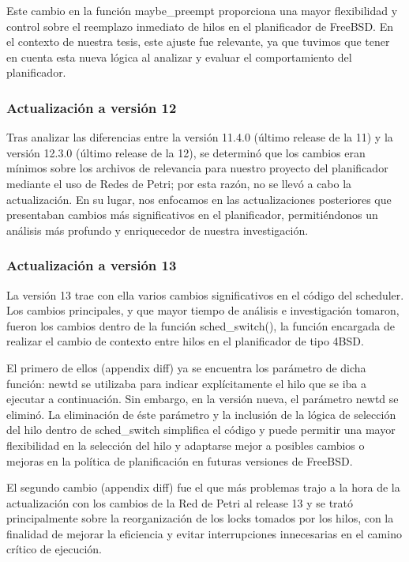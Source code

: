 Este cambio en la función maybe\_preempt proporciona una mayor flexibilidad y control sobre el reemplazo inmediato de hilos en el planificador de FreeBSD. En el contexto de nuestra tesis, este ajuste fue relevante, ya que tuvimos que tener en cuenta esta nueva lógica al analizar y evaluar el comportamiento del planificador.\par


\subsubsection{Actualización a versión 12}

Tras analizar las diferencias entre la versión 11.4.0 (último release de la 11) y la versión 12.3.0 (último release de la 12), se determinó que los cambios eran mínimos sobre los archivos de relevancia para nuestro proyecto del planificador mediante el uso de Redes de Petri; por esta razón, no se llevó a cabo la actualización. En su lugar, nos enfocamos en las actualizaciones posteriores que presentaban cambios más significativos en el planificador, permitiéndonos un análisis más profundo y enriquecedor de nuestra investigación.\par


\subsubsection{Actualización a versión 13}

La versión 13 trae con ella varios cambios significativos en el código del scheduler. Los cambios principales, y que mayor tiempo de análisis e investigación tomaron, fueron los cambios dentro de la función sched\_switch(), la función encargada de realizar el cambio de contexto entre hilos en el planificador de tipo 4BSD.\par

El primero de ellos (appendix diff) ya se encuentra los parámetro de dicha función: newtd se utilizaba para indicar explícitamente el hilo que se iba a ejecutar a continuación. Sin embargo, en la versión nueva, el parámetro newtd se eliminó. La eliminación de éste parámetro y la inclusión de la lógica de selección del hilo dentro de sched\_switch simplifica el código y puede permitir una mayor flexibilidad en la selección del hilo y adaptarse mejor a posibles cambios o mejoras en la política de planificación en futuras versiones de FreeBSD.\par

El segundo cambio (appendix diff) fue el que más problemas trajo a la hora de la actualización con los cambios de la Red de Petri al release 13 y se trató principalmente sobre la reorganización de los locks tomados por los hilos, con la finalidad de mejorar la eficiencia y evitar interrupciones innecesarias en el camino crítico de ejecución.\par


